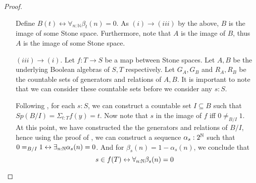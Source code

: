 \begin{proof}
\begin{itemize}
\begin{equation}
     \end{equation} 
     Define $B(t) \leftrightarrow \forall_{n:\mathbb N} \beta_t(n) = 0$. 
     As $(i) \to (iii)$ by the above, $B$ is the image of some Stone space. 
     Furthermore, note that $A$ is the image of $B$, thus $A$ is the image of some Stone space. 
   \item[$(iii) \to (i)$.] 
      Let $f:T\to S$ be a map between Stone spaces. 
      Let $A,B$ be the underlying Boolean algebras of $S,T$ respectively. 
      Let $G_A,G_B$ and $R_A,R_B$ be the countable sets of generators and relations of $A,B$.
      It is important to note that we can consider these countable sets before we consider any $s:S$. 

      Following , for each $s:S$, we can construct 
      a countable set $I\subseteq B$ such that $Sp(B/I) = \Sigma_{t:T} f(y) = t $.
      Now note that $s$ in the image of $f$ iff $0\neq_{B/I} 1$. 
      At this point, we have constructed the the generators and relations of $B/I$, 
      hence using the proof of , we can construct a sequence 
      $\alpha_s:2^{\mathbb{N}}$ such that $0 =_{B/I}1\leftrightarrow \exists_{n:\mathbb{N}} \alpha_s(n) = 0$. 
      And for $\beta_s(n) = 1-\alpha_s(n)$, we conclude that 
      \begin{equation}
        s\in f(T) \leftrightarrow \forall_{n:\mathbb{N}} \beta_s(n) = 0
      \end{equation}
\end{itemize} 
\end{proof} 
